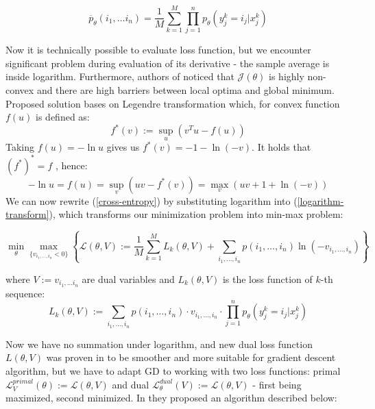 \documentclass[shortabstract,lic,english]{iithesis}
\begin{document}
\begin{equation} \label{expected-probability}
    \overline{p}_\theta(i_1, \dots i_n) = \frac{1}{M}\sum_{k=1}^{M}\prod_{j=1}^{n}p_\theta(y_j^k = i_j | x_j^k)
\end{equation}

Now it is technically possible to evaluate loss function, but we encounter significant problem during evaluation of its derivative - the sample average is inside logarithm. Furthermore, authors of \citep{liu2017unsupervised} noticed that $\mathcal{J}(\theta)$ is highly non-convex and there are high barriers between local optima and global minimum. Proposed solution bases on Legendre transformation  \citep{nielsen2010legendre, boyd2004convex} which, for convex function $f(u)$ is defined as:
\begin{equation} \label{legendre-transformation}
    f^*(v) := \sup_{u}(v^Tu - f(u))
\end{equation}
Taking $f(u)=-\ln u$ gives us $f^*(v) = -1 - \ln(-v)$. It holds that $(f^*)^* = f$ \citep{boyd2004convex}, hence:
\begin{equation} \label{logarithm-transform}
    - \ln u = f(u) = \sup_v(uv - f^*(v)) = \max_v(uv + 1 + \ln(-v))
\end{equation}
We can now rewrite (\ref{cross-entropy}) by substituting logarithm into (\ref{logarithm-transform}), which transforms our minimization problem into min-max problem:

\begin{equation} \label{min-max-definition}
    \min_\theta \max_{\lbrace v_{i_1, \dots , i_n} < 0 \rbrace} \left\lbrace 
    \mathcal{L}(\theta, V) := \frac{1}{M} \sum_{k=1}^M L_k(\theta, V) + \sum_{i_1, \dots, i_n} p(i_1, \dots, i_n) \ln(-v_{i_1, \dots, i_n})
    \right\rbrace 
\end{equation}

where $V := {v_{i_1, \dots i_n}}$ are dual variables and $L_k(\theta, V)$ is the loss function of $k$-th sequence:
\begin{equation}
    L_k(\theta, V) := \sum_{i_1,\dots,i_n} p(i_1,\dots,i_n) \cdot v_{i_1,\dots,i_n} \cdot \prod_{j=1}^{n} p_\theta(y^k_j = i_j | x^k_j)
\end{equation}

Now we have no summation under logarithm, and new dual loss function $L(\theta, V)$ was proven in \citep{liu2017unsupervised} to be smoother and more suitable for gradient descent algorithm, but we have to adapt GD to working with two loss functions: primal $\mathcal{L}_V^{primal}(\theta) := \mathcal{L}(\theta, V)$ and dual $\mathcal{L}_\theta^{dual}(V) := \mathcal{L}(\theta, V)$ - first being maximized, second minimized. In \citep{liu2017unsupervised} they proposed an algorithm described below:
\end{document}
